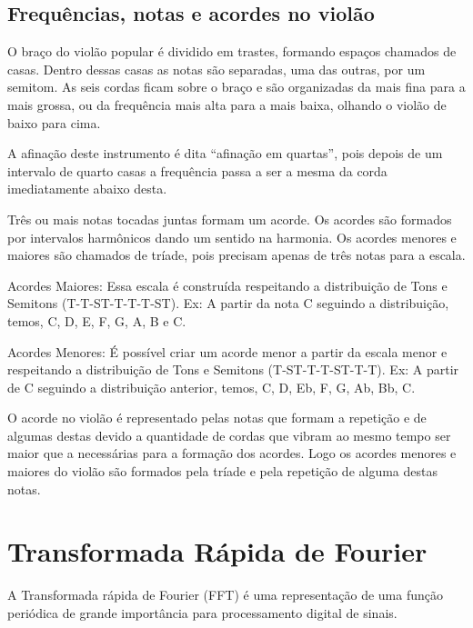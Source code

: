 
\subsection{Frequências, notas e acordes no violão}
O braço do violão popular é dividido em trastes, formando espaços chamados de casas. Dentro dessas casas as notas são separadas, uma das outras, por um semitom. As seis cordas ficam sobre o braço  e são organizadas da mais fina para a mais grossa, ou da frequência mais alta para a mais baixa, olhando o violão de baixo para cima.

A afinação deste instrumento é dita “afinação em quartas”, pois depois de um intervalo de quarto casas a frequência passa a ser a mesma da corda imediatamente abaixo desta.

Três ou mais notas tocadas juntas formam um acorde. Os acordes são formados por intervalos harmônicos dando um sentido na harmonia. Os acordes menores e maiores são chamados de tríade, pois precisam apenas de três notas para a escala.

Acordes Maiores: Essa escala é construída respeitando a distribuição de Tons e Semitons (T-T-ST-T-T-T-ST). Ex: A partir da nota C seguindo a distribuição, temos, C, D, E, F, G, A, B e C.

Acordes Menores: É possível criar um acorde menor a partir da escala menor e respeitando a distribuição de Tons e Semitons (T-ST-T-T-ST-T-T). Ex: A partir de C seguindo a distribuição anterior, temos, C, D, Eb, F, G, Ab, Bb, C.

O acorde no violão é representado pelas notas que formam a repetição e de algumas destas devido a quantidade de cordas que vibram ao mesmo tempo ser maior que a necessárias para a formação dos acordes. Logo os acordes menores e maiores do violão são formados pela tríade e pela repetição de alguma destas notas.
 

\section{Transformada Rápida de Fourier}
\label{cap:conceitos:TTF}


A Transformada rápida de Fourier (\gls{FFT}) é uma representação de uma função periódica de grande importância para processamento digital de sinais.

